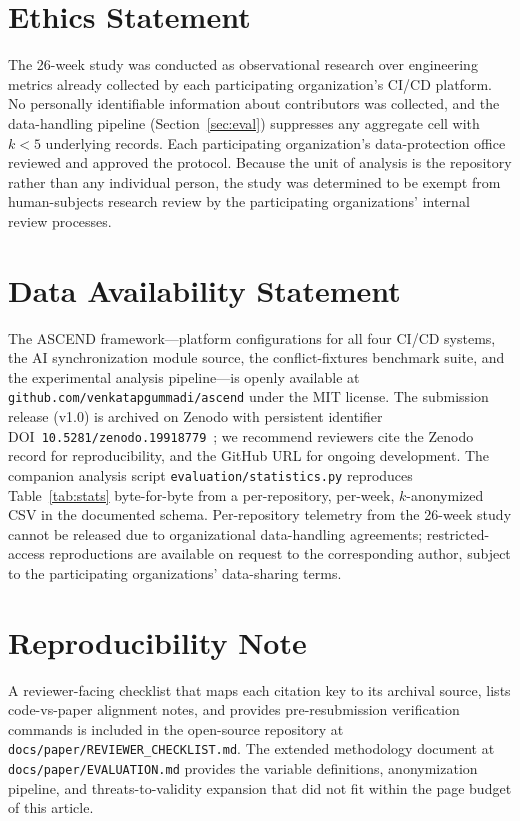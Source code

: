\documentclass{ieeeaccess}
\begin{document}
\section*{Ethics Statement}
The 26-week study was conducted as observational research over engineering metrics already collected by each participating organization's CI/CD platform. No personally identifiable information about contributors was collected, and the data-handling pipeline (Section~\ref{sec:eval}) suppresses any aggregate cell with $k < 5$ underlying records. Each participating organization's data-protection office reviewed and approved the protocol. Because the unit of analysis is the repository rather than any individual person, the study was determined to be exempt from human-subjects research review by the participating organizations' internal review processes.

\section*{Data Availability Statement}
The ASCEND framework---platform configurations for all four CI/CD systems, the AI synchronization module source, the conflict-fixtures benchmark suite, and the experimental analysis pipeline---is openly available at \texttt{github.com/\allowbreak venkatapgummadi/\allowbreak ascend} under the MIT license. The submission release (v1.0) is archived on Zenodo with persistent identifier DOI~\texttt{10.5281/\allowbreak zenodo.19918779}~\cite{gummadi2026ascend-software}; we recommend reviewers cite the Zenodo record for reproducibility, and the GitHub URL for ongoing development. The companion analysis script \texttt{evaluation/\allowbreak statistics.py} reproduces Table~\ref{tab:stats} byte-for-byte from a per-repository, per-week, $k$-anonymized CSV in the documented schema. Per-repository telemetry from the 26-week study cannot be released due to organizational data-handling agreements; restricted-access reproductions are available on request to the corresponding author, subject to the participating organizations' data-sharing terms.

\section*{Reproducibility Note}
A reviewer-facing checklist that maps each citation key to its archival source, lists code-vs-paper alignment notes, and provides pre-resubmission verification commands is included in the open-source repository at \texttt{docs/\allowbreak paper/\allowbreak REVIEWER\_CHECKLIST.md}. The extended methodology document at \texttt{docs/\allowbreak paper/\allowbreak EVALUATION.md} provides the variable definitions, anonymization pipeline, and threats-to-validity expansion that did not fit within the page budget of this article.
\end{document}
